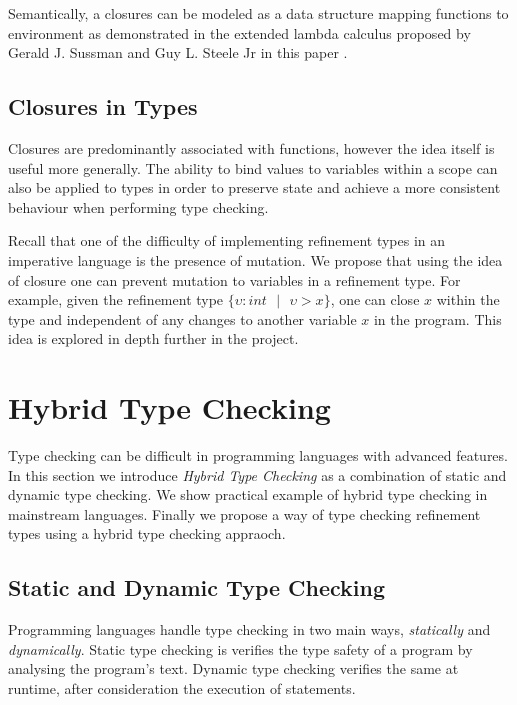 \documentclass[a4paper,12pt]{report}
\begin{document}
\par
Semantically, a closures can be modeled as a data structure mapping 
functions to environment as demonstrated in the extended lambda calculus proposed by 
Gerald J. Sussman and Guy L. Steele Jr in this paper \cite{closureLambdaOp}. 

\subsection{Closures in Types}
Closures are predominantly associated with functions, however the idea 
itself is useful more generally. The ability to bind values to variables 
within a scope can also be applied to types in order to preserve state and achieve 
a more consistent behaviour when performing type checking. 

\par
Recall that one of the difficulty of implementing refinement types in an 
imperative language is the presence of mutation. We propose that using the idea  
of closure one can prevent mutation to variables in a refinement type. For 
example, given the refinement type 
$\{\upsilon : int \text{ }|\text{ }\upsilon > x\}$, one can close $x$ within the 
type and independent of any changes to another variable $x$ in the program. 
This idea is explored in depth further in the project.

\section{Hybrid Type Checking} \label{section:hybrid_type_checking}
Type checking can be difficult in programming languages with advanced features. 
In this section we introduce \emph{Hybrid Type Checking} \cite{hybridTypeChecking} 
as a combination of static and dynamic type checking. We show practical example 
of hybrid type checking in mainstream languages. Finally we propose a way of 
type checking refinement types using a hybrid type checking appraoch.

\subsection{Static and Dynamic Type Checking}
Programming languages handle type checking in two main ways, \textit{statically} 
and \textit{dynamically}. Static type checking is verifies the type 
safety of a program by analysing the program's text. Dynamic type checking 
verifies the same at runtime, after consideration the execution of statements. 
\end{document}
